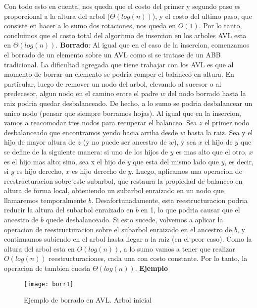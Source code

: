 \documentclass[10pt,a4paper]{article}
\begin{document}
Con todo esto en cuenta, nos queda que el costo del primer y segundo paso es proporcional a la altura del arbol ($\Theta(log(n))$), y el costo del ultimo paso, que consiste en hacer a lo sumo dos rotaciones, nos queda en $O(1)$. Por lo tanto, concluimos que el costo total del algoritmo de insercion en los arboles AVL esta en $\Theta(log(n))$.
\newpage
\textbf{Borrado}: Al igual que en el caso de la insercion, comenzamos el borrado de un elemento sobre un AVL como si se tratase de un ABB tradicional. La dificultad agregada que tiene trabajar con los AVL es que al momento de borrar un elemento se podria romper el balanceo en altura. En particular, luego de remover un nodo del arbol, elevando al sucesor o al predecesor, algun nodo en el camino entre el padre $w$ del nodo borrado hasta la raiz  podria quedar desbalanceado. De hecho, a lo sumo se podria desbalancear un unico nodo (pensar que siempre borramos hojas).
\newline
\newline
Al igual que en la insercion, vamos a reacomodar tres nodos para recuperar el balanceo. Sea $z$ el primer nodo desbalanceado que encontramos yendo hacia arriba desde $w$ hasta la raiz. Sea y el hijo de mayor altura de $z$ (y no puede ser ancestro de $w$), y sea $x$ el hijo de $y$ que se define de la siguiente manera: si uno de los hijos de $y$ es mas alto que el otro, $x$ es el hijo mas alto; sino, sea x el hijo de $y$ que esta del mismo lado que $y$, es decir, si $y$ es hijo derecho, $x$ es hijo derecho de $y$.
\newline
\newline
Luego, aplicamos una operacion de reestructuracion sobre este subarbol, que restaura la propiedad de balanceo en altura de forma local, obteniendo un subarbol enraizado en un nodo que llamaremos temporalmente $b$. Desafortunadamente, esta reestructuracion podria reducir la altura del subarbol enraizado en $b$ en 1, lo que podria causar que el ancestro de $b$ quede desbalanceado. Si esto sucede, volvemos a aplicar la operacion de reestructuracion sobre el subarbol enraizado en el ancestro de $b$, y continuamos subiendo en el arbol hasta llegar a la raiz (en el peor caso). Como la altura del arbol esta en $O(log(n))$, a lo sumo vamos a tener que realizar $O(log(n))$ reestructuraciones, cada una con costo constante. Por lo tanto, la operacion de  tambien cuesta $\Theta(log(n))$.
\newline
\newline
\textbf{Ejemplo}
\newline
\newline
\begin{figure}[h]
	\centering
	\texttt{[image: borr1]}
	\caption{Ejemplo de borrado en AVL. Arbol inicial}
	\label{drivers1}
\end{figure}
\newpage
\end{document}
